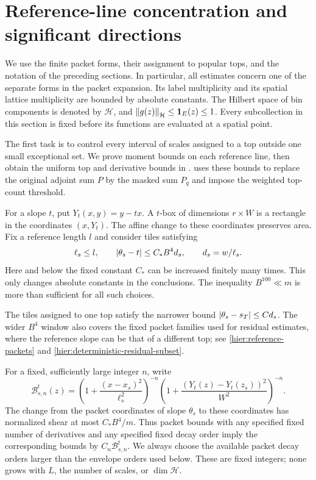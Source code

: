 \section{Reference-line concentration and significant directions}
\label{conc:section}

We use the finite packet forms, their assignment to popular tops, and the
notation of the preceding sections.  In particular, all estimates concern
one of the separate forms in the packet expansion.  Its label multiplicity
and its spatial lattice multiplicity are bounded by absolute constants.
The Hilbert space of bin components is denoted by $\mathcal H$, and
$\left\|g(z)\right\|_{\mathcal H}\leq\mathbf 1_E(z)\leq1$.
Every subcollection in this section is fixed before its functions are
evaluated at a spatial point.

The first task is to control every interval of scales assigned to a top
outside one small exceptional set.  We prove moment bounds on
each reference line, then obtain the uniform top and derivative bounds
in .   uses these bounds to
replace the original adjoint sum $P$ by the masked sum $P_q$ and impose
the weighted top-count threshold.

For a slope $t$, put $Y_t(x,y)=y-tx$.  A $t$-box of dimensions $r\times W$
is a rectangle in the coordinates $(x,Y_t)$.  The affine change to these
coordinates preserves area.  Fix a reference length $l$ and consider
tiles satisfying
\begin{equation}\label{eq:src-9}
 \ell_s\leq l,\qquad
 \left|\theta_s-t\right|\leq C_* B^4d_s,\qquad d_s=w/\ell_s.
\end{equation}
Here and below the fixed constant $C_*$ can be increased finitely many
times.  This only changes absolute constants in the conclusions.  The
inequality $B^{100}\ll m$ is more than sufficient for all such choices.

The tiles assigned to one top satisfy the narrower bound
$\left|\theta_s-s_T\right|\leq C d_s$.  The wider $B^4$ window also covers the
fixed packet families used for residual estimates, where the reference
slope can be that of a different top; see
\eqref{hier:reference-packets} and \eqref{hier:deterministic-residual-subset}.

For a fixed, sufficiently large integer $n$, write
\begin{equation}\label{conc:envelope}
 \mathcal B_{s,n}^{t}(z)=
 \left(1+\frac{(x-x_s)^2}{\ell_s^2}\right)^{-n}
 \left(1+\frac{(Y_t(z)-Y_t(z_s))^2}{W^2}\right)^{-n}.
\end{equation}
The change from the packet coordinates of slope $\theta_s$ to these
coordinates has normalized shear at most $C_*B^4/m$.  Thus packet bounds
with any specified fixed number of derivatives and any specified fixed
decay order imply the corresponding bounds by
$C_n\mathcal B_{s,n}^{t}$.  We always choose the available packet decay
orders larger than the envelope orders used below.  These are fixed
integers; none grows with $L$, the number of scales, or $\dim\mathcal H$.


